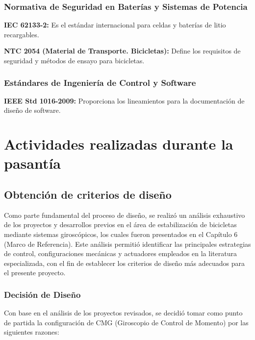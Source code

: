 \documentclass[12pt,letterpaper]{report}
\begin{document}
\subsection{Normativa de Seguridad en Baterías y Sistemas de Potencia}

\textbf{IEC 62133-2:} Es el estándar internacional para celdas y baterías de litio recargables.

\textbf{NTC 2054 (Material de Transporte. Bicicletas):} Define los requisitos de seguridad y métodos de ensayo para bicicletas.

\subsection{Estándares de Ingeniería de Control y Software}

\textbf{IEEE Std 1016-2009:} Proporciona los lineamientos para la documentación de diseño de software.

\chapter{Actividades realizadas durante la pasantía}

\section{Obtención de criterios de diseño}

Como parte fundamental del proceso de diseño, se realizó un análisis exhaustivo de los proyectos y desarrollos previos en el área de estabilización de bicicletas mediante sistemas giroscópicos, los cuales fueron presentados en el Capítulo 6 (Marco de Referencia). Este análisis permitió identificar las principales estrategias de control, configuraciones mecánicas y actuadores empleados en la literatura especializada, con el fin de establecer los criterios de diseño más adecuados para el presente proyecto.

\subsection*{Decisión de Diseño}

Con base en el análisis de los proyectos revisados, se decidió tomar como punto de partida la configuración de CMG (Giroscopio de Control de Momento) por las siguientes razones:
\end{document}
